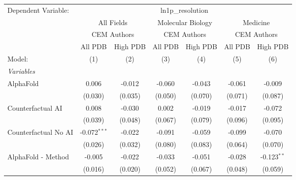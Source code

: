 \begingroup
\centering
\begin{tabular}{lcccccc}
   \tabularnewline \midrule \midrule
   Dependent Variable: & \multicolumn{6}{c}{ln1p\_resolution}\\
 & \multicolumn{2}{c}{All Fields} & \multicolumn{2}{c}{Molecular Biology} & \multicolumn{2}{c}{Medicine} \\
\cmidrule(lr){2-3} \cmidrule(lr){4-5} \cmidrule(lr){6-7}
 & \multicolumn{2}{c}{CEM Authors} & \multicolumn{2}{c}{CEM Authors} & \multicolumn{2}{c}{CEM Authors} \\
\cmidrule(lr){2-3} \cmidrule(lr){4-5} \cmidrule(lr){6-7}
 & \multicolumn{1}{c}{All PDB} & \multicolumn{1}{c}{High PDB} & \multicolumn{1}{c}{All PDB} & \multicolumn{1}{c}{High PDB} & \multicolumn{1}{c}{All PDB} & \multicolumn{1}{c}{High PDB} \\
\cmidrule(lr){2-2} \cmidrule(lr){3-3} \cmidrule(lr){4-4} \cmidrule(lr){5-5} \cmidrule(lr){6-6} \cmidrule(lr){7-7}
   Model:                                                     & (1)            & (2)         & (3)          & (4)        & (5)           & (6)\\  
   \midrule
   \emph{Variables}\\
   AlphaFold                                                  & 0.006          & -0.012      & -0.060       & -0.043     & -0.061        & -0.009\\   
                                                              & (0.030)        & (0.035)     & (0.050)      & (0.070)    & (0.071)       & (0.087)\\   
   Counterfactual AI                                          & 0.008          & -0.030      & 0.002        & -0.019     & -0.017        & -0.072\\   
                                                              & (0.039)        & (0.048)     & (0.067)      & (0.079)    & (0.096)       & (0.095)\\   
   Counterfactual No AI                                       & -0.072$^{***}$ & -0.022      & -0.091       & -0.059     & -0.099        & -0.070\\   
                                                              & (0.026)        & (0.032)     & (0.080)      & (0.083)    & (0.064)       & (0.070)\\   
   AlphaFold - Method                                         & -0.005         & -0.022      & -0.033       & -0.051     & -0.028        & -0.123$^{**}$\\   
                                                              & (0.016)        & (0.020)     & (0.052)      & (0.067)    & (0.048)       & (0.059)\\   

\end{tabular}
